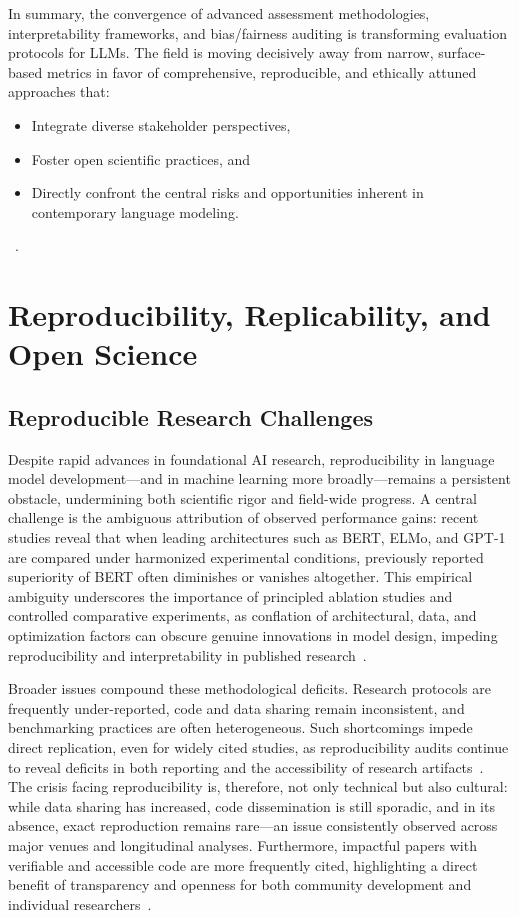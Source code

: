 In summary, the convergence of advanced assessment methodologies, interpretability frameworks, and bias/fairness auditing is transforming evaluation protocols for LLMs. The field is moving decisively away from narrow, surface-based metrics in favor of comprehensive, reproducible, and ethically attuned approaches that:
\begin{itemize}
    \item Integrate diverse stakeholder perspectives,
    \item Foster open scientific practices, and
    \item Directly confront the central risks and opportunities inherent in contemporary language modeling.
\end{itemize}
~\cite{ref1, ref3, ref10, ref14, ref19, ref35, ref36, ref43, ref45, ref46, ref49, ref52, ref65, ref73, ref76, ref81, ref83, ref84, ref85, ref91, ref94, ref95, ref101, ref104, ref106, ref108}.

\section{Reproducibility, Replicability, and Open Science}

\subsection{Reproducible Research Challenges}

Despite rapid advances in foundational AI research, reproducibility in language model development—and in machine learning more broadly—remains a persistent obstacle, undermining both scientific rigor and field-wide progress. A central challenge is the ambiguous attribution of observed performance gains: recent studies reveal that when leading architectures such as BERT, ELMo, and GPT-1 are compared under harmonized experimental conditions, previously reported superiority of BERT often diminishes or vanishes altogether. This empirical ambiguity underscores the importance of principled ablation studies and controlled comparative experiments, as conflation of architectural, data, and optimization factors can obscure genuine innovations in model design, impeding reproducibility and interpretability in published research~\cite{ref107}.

Broader issues compound these methodological deficits. Research protocols are frequently under-reported, code and data sharing remain inconsistent, and benchmarking practices are often heterogeneous. Such shortcomings impede direct replication, even for widely cited studies, as reproducibility audits continue to reveal deficits in both reporting and the accessibility of research artifacts~\cite{ref107,ref108}. The crisis facing reproducibility is, therefore, not only technical but also cultural: while data sharing has increased, code dissemination is still sporadic, and in its absence, exact reproduction remains rare—an issue consistently observed across major venues and longitudinal analyses. Furthermore, impactful papers with verifiable and accessible code are more frequently cited, highlighting a direct benefit of transparency and openness for both community development and individual researchers~\cite{ref108}.

